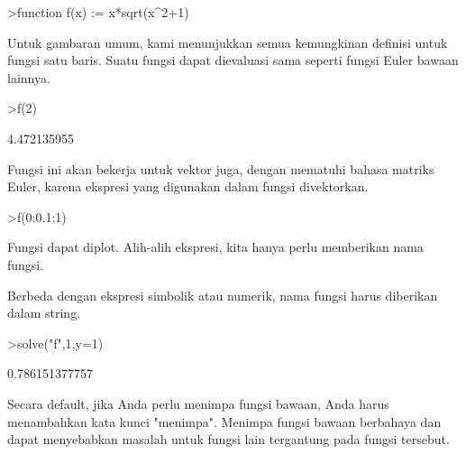 \documentclass[a4paper,10pt]{article}
\begin{document}
\begin{eulernotebook}
\begin{eulercomment}
\begin{eulercomment}
\begin{eulerprompt}
>function f(x) := x*sqrt(x^2+1)
\end{eulerprompt}
\begin{eulercomment}
Untuk gambaran umum, kami menunjukkan semua kemungkinan definisi untuk
fungsi satu baris. Suatu fungsi dapat dievaluasi sama seperti fungsi
Euler bawaan lainnya.
\end{eulercomment}
\begin{eulerprompt}
>f(2)
\end{eulerprompt}
\begin{euleroutput}
  4.472135955
\end{euleroutput}
\begin{eulercomment}
Fungsi ini akan bekerja untuk vektor juga, dengan mematuhi bahasa
matriks Euler, karena ekspresi yang digunakan dalam fungsi
divektorkan.
\end{eulercomment}
\begin{eulerprompt}
>f(0:0.1:1)
\end{eulerprompt}
\begin{euleroutput}
  [0,  0.100499,  0.203961,  0.313209,  0.430813,  0.559017,  0.699714,
  0.854459,  1.0245,  1.21083,  1.41421]
\end{euleroutput}
\begin{eulercomment}
Fungsi dapat diplot. Alih-alih ekspresi, kita hanya perlu memberikan
nama fungsi.

Berbeda dengan ekspresi simbolik atau numerik, nama fungsi harus
diberikan dalam string.
\end{eulercomment}
\begin{eulerprompt}
>solve("f",1,y=1)
\end{eulerprompt}
\begin{euleroutput}
  0.786151377757
\end{euleroutput}
\begin{eulercomment}
Secara default, jika Anda perlu menimpa fungsi bawaan, Anda harus
menambahkan kata kunci "menimpa". Menimpa fungsi bawaan berbahaya dan
dapat menyebabkan masalah untuk fungsi lain tergantung pada fungsi
tersebut.


\end{eulercomment}
\end{eulercomment}
\end{eulercomment}
\end{eulernotebook}
\end{document}
